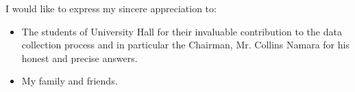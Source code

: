 
\cleardoublepage


\begin{acknowledgements}

I would like to express my sincere appreciation to:

\begin{itemize}
 \item The students of University Hall for their invaluable contribution to the data collection process and in particular the Chairman, Mr. Collins Namara for his honest and precise answers.
 \vspace*{3mm}
 \item My family and friends.
\end{itemize}

\end{acknowledgements}
